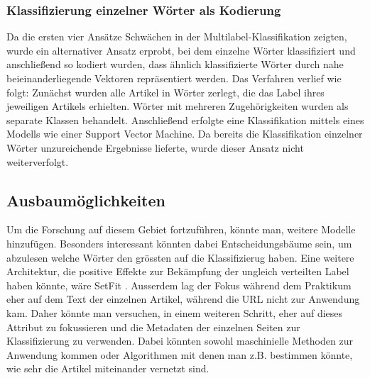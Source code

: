 \subsubsection{Klassifizierung einzelner Wörter als Kodierung}
Da die ersten vier Ansätze Schwächen in der Multilabel-Klassifikation zeigten, wurde ein alternativer Ansatz erprobt, bei dem einzelne Wörter klassifiziert und anschließend so kodiert wurden, dass ähnlich klassifizierte Wörter durch nahe beieinanderliegende Vektoren repräsentiert werden. Das Verfahren verlief wie folgt: Zunächst wurden alle Artikel in Wörter zerlegt, die das Label ihres jeweiligen Artikels erhielten. Wörter mit mehreren Zugehörigkeiten wurden als separate Klassen behandelt. Anschließend erfolgte eine Klassifikation mittels eines Modells wie einer Support Vector Machine. Da bereits die Klassifikation einzelner Wörter unzureichende Ergebnisse lieferte, wurde dieser Ansatz nicht weiterverfolgt.


\subsection{Ausbaumöglichkeiten}
Um die Forschung auf diesem Gebiet fortzuführen, könnte man, weitere Modelle hinzufügen. Besonders interessant könnten dabei Entscheidungsbäume sein, um abzulesen welche Wörter den grössten auf die Klassifizierug haben. Eine weitere Architektur, die positive Effekte zur Bekämpfung der ungleich verteilten Label haben könnte, wäre SetFit \cite{Tunstall2022}. Ausserdem lag der Fokus während dem Praktikum eher auf dem Text der einzelnen Artikel, während die URL nicht zur Anwendung kam. Daher könnte man versuchen, in einem weiteren Schritt, eher auf dieses Attribut zu fokussieren und die Metadaten der einzelnen Seiten zur Klassifizierung zu verwenden. Dabei könnten sowohl maschinielle Methoden zur Anwendung kommen oder Algorithmen mit denen man z.B. bestimmen könnte, wie sehr die Artikel miteinander vernetzt sind.
